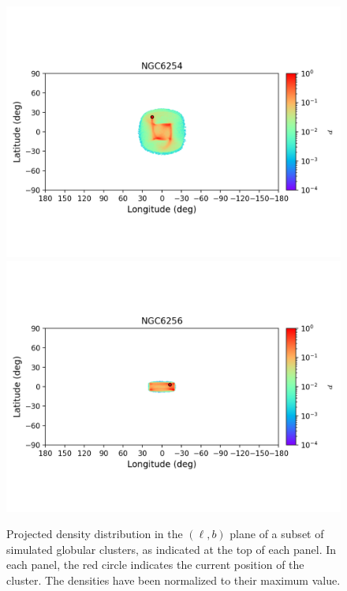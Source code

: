 \begin{figure}
\begin{center}
                \includegraphics[clip=true, trim = 0mm 20mm 0mm 10mm, width=1\columnwidth]{images/error_plots_NGC6254.png}
                \includegraphics[clip=true, trim = 0mm 20mm 0mm 10mm, width=1\columnwidth]{images/error_plots_NGC6256.png}
            \end{center}
            \caption[]{Projected density distribution in the $(\ell, b)$ plane of a subset of simulated globular clusters, as indicated at the top of each panel. In each panel, the red circle indicates the current position of the cluster. The densities have been normalized to their maximum value.}\label{stream8}
        \end{figure}
        
